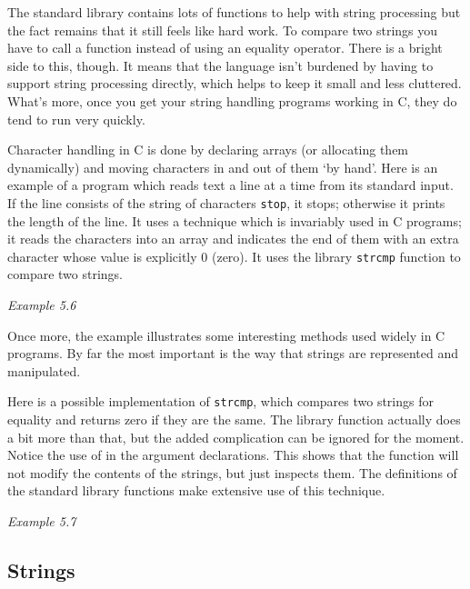   The standard library contains lots of functions to help with string
   processing but the fact remains that it still feels like hard work. To
   compare two strings you have to call a function instead of using an
   equality operator. There is a bright side to this, though. It means that
   the language isn't burdened by having to support string processing
   directly, which helps to keep it small and less cluttered. What's more,
   once you get your string handling programs working in C, they do tend to
   run very quickly.


  Character handling in C is done by declaring arrays (or allocating them
   dynamically) and moving characters in and out of them `by hand'.
   Here is an example of a program which reads text a line at a time from
   its standard input. If the line consists of the string of characters
   \texttt{stop}, it stops; otherwise it prints the length of the line.
   It uses a technique which is invariably used in C programs; it reads the
   characters into an array and indicates the end of them with an extra
   character whose value is explicitly 0 (zero). It uses the library
   \texttt{strcmp} function to compare two strings.


   \begin{center}\textit{Example 5.6}\end{center}


  Once more, the example illustrates some interesting methods used widely
   in C programs. By far the most important is the way that strings are
   represented and manipulated.


  Here is a possible implementation of \texttt{strcmp}, which
   compares two strings for equality and returns zero if they are the same.
   The library function actually does a bit more than that, but the added
   complication can be ignored for the moment. Notice the use of
   \const{} in the argument declarations. This shows that the
   function will not modify the contents of the strings, but just inspects
   them. The definitions of the standard library functions make extensive
   use of this technique.


  \begin{center}\textit{Example 5.7}\end{center}


  \subsection{Strings}
   

